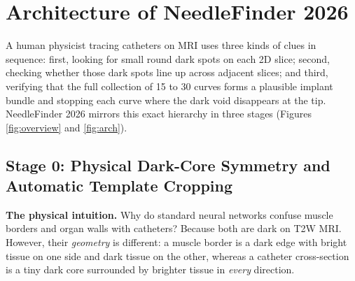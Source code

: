 \documentclass[
  11pt,
]{article}
\begin{document}
\FloatBarrier

\section{Architecture of NeedleFinder
2026}\label{architecture-of-needlefinder-2026}

A human physicist tracing catheters on MRI uses three kinds of clues in
sequence: first, looking for small round dark spots on each 2D slice;
second, checking whether those dark spots line up across adjacent
slices; and third, verifying that the full collection of 15 to 30 curves
forms a plausible implant bundle and stopping each curve where the dark
void disappears at the tip. NeedleFinder 2026 mirrors this exact
hierarchy in three stages (Figures \ref{fig:overview} and
\ref{fig:arch}).

\subsection{Stage 0: Physical Dark-Core Symmetry and Automatic Template
Cropping}\label{stage-0-physical-dark-core-symmetry-and-automatic-template-cropping}

\textbf{The physical intuition.} Why do standard neural networks confuse
muscle borders and organ walls with catheters? Because both are dark on
T2W MRI. However, their \emph{geometry} is different: a muscle border is
a dark edge with bright tissue on one side and dark tissue on the other,
whereas a catheter cross-section is a tiny dark core surrounded by
brighter tissue in \emph{every} direction.
\end{document}
